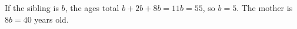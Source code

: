 If the sibling is $b$, the ages total $b+2b+8b=11b=55$, so $b=5$. The mother is $8b=\boxed{40}$ years old.
